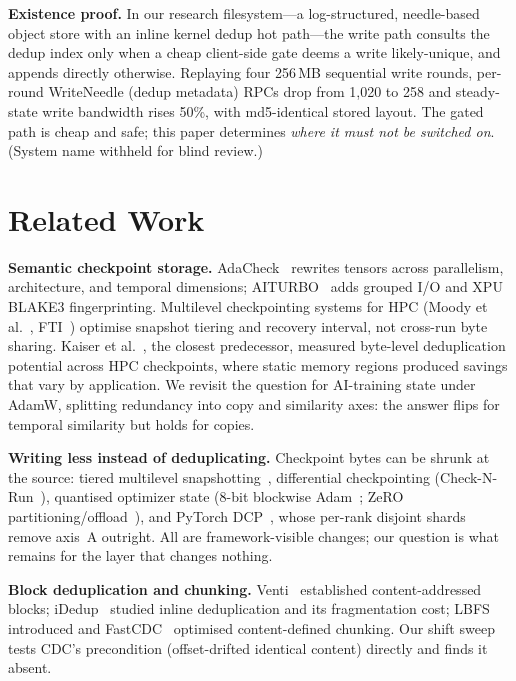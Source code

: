\documentclass[sigconf,10pt,anonymous,review]{acmart}
\begin{document}
\textbf{Existence proof.} In our research filesystem---a log-structured,
needle-based object store with an inline kernel dedup hot path---the
write path consults the dedup index only when a cheap client-side gate
deems a write likely-unique, and appends directly otherwise. Replaying
four 256\,MB sequential write rounds, per-round WriteNeedle (dedup
metadata) RPCs drop from 1,020 to 258 and steady-state write bandwidth
rises 50\%, with md5-identical stored layout. The gated path is cheap
and safe; this paper determines \emph{where it must not be switched on}.
(System name withheld for blind review.)

\section{Related Work}
\label{sec:related}

\textbf{Semantic checkpoint storage.} AdaCheck~\cite{adacheck} rewrites
tensors across parallelism, architecture, and temporal dimensions;
AITURBO~\cite{aiturbo} adds grouped I/O and XPU BLAKE3 fingerprinting.
Multilevel checkpointing systems for HPC (Moody et al.~\cite{moody2010},
FTI~\cite{fti2011}) optimise snapshot tiering and recovery interval, not
cross-run byte sharing. Kaiser et al.~\cite{kaiser2016}, the closest
predecessor, measured byte-level deduplication potential across HPC
checkpoints, where static memory regions produced savings that vary by
application. We revisit the question for AI-training state under AdamW,
splitting redundancy into copy and similarity axes: the answer flips for
temporal similarity but holds for copies.

\textbf{Writing less instead of deduplicating.} Checkpoint bytes can be
shrunk at the source: tiered multilevel snapshotting~\cite{moody2010,
fti2011}, differential checkpointing (Check-N-Run~\cite{checknrun}),
quantised optimizer state (8-bit blockwise Adam~\cite{dettmers8bit};
ZeRO partitioning/offload~\cite{zero}), and PyTorch DCP~\cite{dcp},
whose per-rank disjoint shards remove axis~A outright. All are
framework-visible changes; our question is what remains for the layer
that changes nothing.

\textbf{Block deduplication and chunking.} Venti~\cite{venti}
established content-addressed blocks; iDedup~\cite{idedup} studied inline
deduplication and its fragmentation cost; LBFS~\cite{lbfs} introduced and
FastCDC~\cite{fastcdc} optimised content-defined chunking. Our shift
sweep tests CDC's precondition (offset-drifted identical content) directly
and finds it absent.
\end{document}
